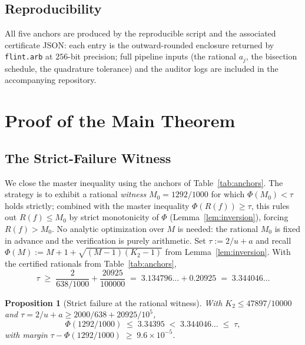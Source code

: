 \documentclass[11pt, letterpaper]{article}
\theoremstyle{paperplain}
\newtheorem{proposition}[theorem]{Proposition}
\theoremstyle{paperdef}
\begin{document}
\subsection{Reproducibility}\label{subsec:cert-repro}

All five anchors are produced by the reproducible script and the
associated certificate JSON: each entry is the outward-rounded enclosure
returned by \texttt{flint.arb} at $256$-bit precision; full pipeline
inputs (the rational $a_j$, the bisection schedule, the
quadrature tolerance) and the auditor logs are included in the
accompanying repository.

\section{Proof of the Main Theorem}\label{sec:proof}

\subsection{The Strict-Failure Witness}\label{subsec:proof-witness}

We close the master inequality using the anchors of
Table~\ref{tab:anchors}.  The strategy is to exhibit a rational
\emph{witness} $M_0=1292/1000$ for which $\Phi(M_0)<\tau$ holds
strictly; combined with the master inequality $\Phi(R(f))\ge\tau$,
this rules out $R(f)\le M_0$ by strict monotonicity of $\Phi$
(Lemma~\ref{lem:inversion}), forcing $R(f)>M_0$.  No analytic
optimization over $M$ is needed: the rational $M_0$ is fixed in
advance and the verification is purely arithmetic.
Set $\tau:=2/u+a$ and recall
$\Phi(M):=M+1+\sqrt{(M-1)(K_2-1)}$ from Lemma~\ref{lem:inversion}.
With the certified rationals from Table~\ref{tab:anchors},
\[
  \tau
  \;\ge\; \frac{2}{638/1000} + \frac{20925}{100000}
  \;=\; 3.134796\ldots + 0.20925
  \;=\; 3.344046\ldots
\]

\begin{proposition}[Strict failure at the rational witness]
\label{prop:fail}
With $K_2\le 47897/10000$ and $\tau=2/u+a\ge 2000/638+20925/10^{5}$,
\begin{equation}\label{eq:strict}
  \Phi(1292/1000) \;\le\; 3.34395
  \;<\; 3.344046\ldots \;\le\; \tau,
\end{equation}
with margin $\tau-\Phi(1292/1000)\;\ge\; 9.6\times 10^{-5}$.
\end{proposition}
\end{document}
